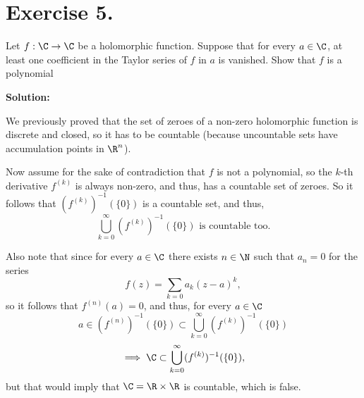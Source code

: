 \section*{Exercise 5.}

Let $f:\C \to \C$ be a holomorphic function. Suppose that for every $a \in \C$, at least one coefficient in the Taylor series of $f$ in $a$ is vanished. Show that $f$ is a polynomial

\textbf{Solution:}

We previously proved that the set of zeroes of a non-zero holomorphic function is discrete and closed, so it has to be countable (because uncountable sets have accumulation points in $\R^n$). 

Now assume for the sake of contradiction that $f$ is not a polynomial, so the $k$-th derivative $f^{(k)}$ is always non-zero, and thus, has a countable set of zeroes. So it follows that $(f^{(k)})^{-1}(\{0\})$ is a countable set, and thus,
\[ \bigcup_{k = 0}^{\infty}(f^{(k)})^{-1}(\{0\})\mbox{ is countable too.} \]

Also note that since for every $a\in \C$ there exists $n\in \N$ such that $a_n = 0$ for the series
\[ f(z) = \sum_{k = 0} a_k(z-a)^k, \]
so it follows that $f^{(n)}(a) = 0$, and thus, for every $a \in \C$
\[ a \in (f^{(n)})^{-1}(\{0\}) \subset \bigcup_{k = 0}^{\infty}(f^{(k)})^{-1}(\{0\}) \]
\[ \implies \C \subset \bigcup_{k = 0}^{\infty}(f^{(k)})^{-1}(\{0\}), \]
but that would imply that $\C = \R \times \R$ is countable, which is false.